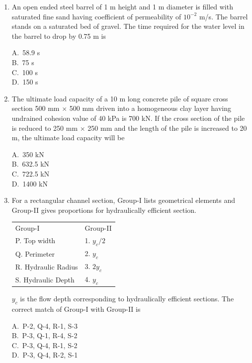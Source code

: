 \documentclass[journal,12pt,onecolumn]{exam}
\theoremstyle{remark}
\begin{document}
\begin{enumerate}
\noindent\item An open ended steel barrel of 1 m height and 1 m diameter is filled with saturated fine sand having coefficient of permeability of $10^{-2}$ m/s. The barrel stands on a saturated bed of gravel. The time required for the water level in the barrel to drop by 0.75 m is \hfill{}
\begin{multicols}{4}
A.\ 58.9 s \\
B.\ 75 s \\
C.\ 100 s \\
D.\ 150 s
\end{multicols}

\noindent\item The ultimate load capacity of a 10 m long concrete pile of square cross section 500 mm $\times$ 500 mm driven into a homogeneous clay layer having undrained cohesion value of 40 kPa is 700 kN. If the cross section of the pile is reduced to 250 mm $\times$ 250 mm and the length of the pile is increased to 20 m, the ultimate load capacity will be
\hfill{}
\begin{multicols}{4}
A.\ 350 kN \\
B.\ 632.5 kN \\
C.\ 722.5 kN \\
D.\ 1400 kN
\end{multicols}

\setlength{\parindent}{0pt}
\setlength{\parskip}{0.5cm}


\noindent\item For a rectangular channel section, {Group-I} lists geometrical elements and {Group-II} gives proportions for hydraulically efficient section. 

\begin{table}[H]
\centering
\begin{tabular}{l l}
Group-I & Group-II  \\
P. Top width     & 1. $y_c/2$ \\
Q. Perimeter    & 2.  $y_c$     \\
R. Hydraulic Radius    & 3.  $2y_c$          \\
S. Hydraulic Depth    & 4. $y_c$
\end{tabular}
\label{table3}
\end{table}
$y_c$ is the flow depth corresponding to hydraulically efficient sections. The correct match of {Group-I} with {Group-II} is
\hfill{}
\begin{multicols}{4}
A.\ P-2, Q-4, R-1, S-3 \\
B.\ P-3, Q-1, R-4, S-2 \\
C.\ P-3, Q-4, R-1, S-2 \\
D.\ P-3, Q-4, R-2, S-1
\end{multicols}


\end{enumerate}
\end{document}
